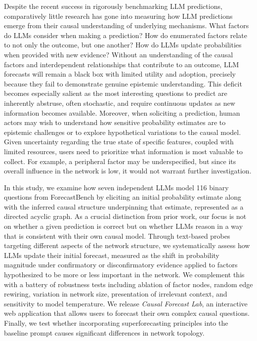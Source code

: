 \documentclass[11pt]{article}
\begin{document}
Despite the recent success in rigorously benchmarking LLM predictions, comparatively little research has gone into measuring how LLM predictions emerge from their causal understanding of underlying mechanisms. What factors do LLMs consider when making a prediction? How do enumerated factors relate to not only the outcome, but one another? How do LLMs update probabilities when provided with new evidence? Without an understanding of the causal factors and interdependent relationships that contribute to an outcome, LLM forecasts will remain a black box with limited utility and adoption, precisely because they fail to demonstrate genuine epistemic understanding. This deficit becomes especially salient as the most interesting questions to predict are inherently abstruse, often stochastic, and require continuous updates as new information becomes available. Moreover, when soliciting a prediction, human actors may wish to understand how sensitive probability estimates are to epistemic challenges or to explore hypothetical variations to the causal model. Given uncertainty regarding the true state of specific features, coupled with limited resources, users need to prioritize what information is most valuable to collect. For example, a peripheral factor may be underspecified, but since its overall influence in the network is low, it would not warrant further investigation.

In this study, we examine how seven independent LLMs model 116 binary questions from ForecastBench \citep{zou2024forecastbench} by eliciting an initial probability estimate along with the inferred causal structure underpinning that estimate, represented as a directed acyclic graph. As a crucial distinction from prior work, our focus is not on whether a given prediction is correct but on whether LLMs reason in a way that is consistent with their own causal model. Through text-based probes targeting different aspects of the network structure, we systematically assess how LLMs update their initial forecast, measured as the shift in probability magnitude under confirmatory or disconfirmatory evidence applied to factors hypothesized to be more or less important in the network. We complement this with a battery of robustness tests including ablation of factor nodes, random edge rewiring, variation in network size, presentation of irrelevant context, and sensitivity to model temperature. We release \emph{Causal Forecast Lab}, an interactive web application that allows users to forecast their own complex causal questions. Finally, we test whether incorporating superforecasting principles into the baseline prompt causes significant differences in network topology.
\end{document}
